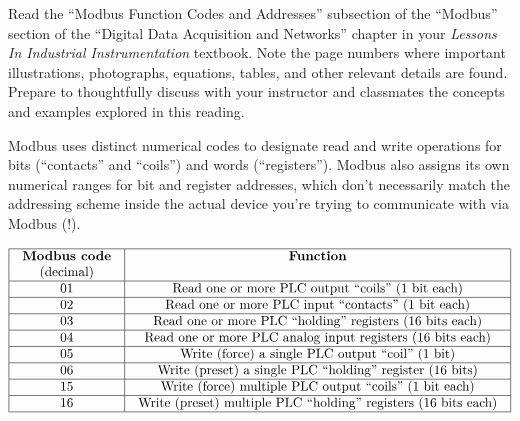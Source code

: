 

Read the ``Modbus Function Codes and Addresses'' subsection of the ``Modbus'' section of the ``Digital Data Acquisition and Networks'' chapter in your {\it Lessons In Industrial Instrumentation} textbook.  Note the page numbers where important illustrations, photographs, equations, tables, and other relevant details are found.  Prepare to thoughtfully discuss with your instructor and classmates the concepts and examples explored in this reading.














Modbus uses distinct numerical codes to designate read and write operations for bits (``contacts'' and ``coils'') and words (``registers'').  Modbus also assigns its own numerical ranges for bit and register addresses, which don't necessarily match the addressing scheme inside the actual device you're trying to communicate with via Modbus (!).


$$\vbox{\offinterlineskip
\halign{\strut
\vrule \quad\hfil # \ \hfil & 
\vrule \quad\hfil # \ \hfil \vrule \cr
\noalign{\hrule}
%
{\bf Modbus code} & {\bf Function} \cr
(decimal) &  \cr
%
\noalign{\hrule}
%
01 & Read one or more PLC output ``coils'' (1 bit each) \cr
%
\noalign{\hrule}
%
02 & Read one or more PLC input ``contacts'' (1 bit each) \cr
%
\noalign{\hrule}
%
03 & Read one or more PLC ``holding'' registers (16 bits each) \cr
%
\noalign{\hrule}
%
04 & Read one or more PLC analog input registers (16 bits each) \cr
%
\noalign{\hrule}
%
05 & Write (force) a single PLC output ``coil'' (1 bit) \cr
%
\noalign{\hrule}
%
06 & Write (preset) a single PLC ``holding'' register (16 bits) \cr
%
\noalign{\hrule}
%
15 & Write (force) multiple PLC output ``coils'' (1 bit each) \cr
%
\noalign{\hrule}
%
16 & Write (preset) multiple PLC ``holding'' registers (16 bits each) \cr
%
\noalign{\hrule}
} %
}$$ %

